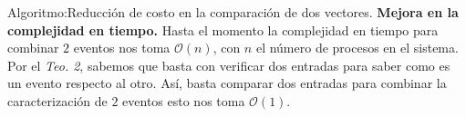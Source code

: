 \begin{frame}{Algoritmo:}{Reducción de costo en la comparación de dos vectores.}
  \justifying
  \textbf{Mejora en la complejidad en tiempo.} Hasta el momento la complejidad
  en tiempo para combinar $2$ eventos nos toma $\mathcal{O}(n)$, con $n$ el
  número de procesos en el sistema.\\[0.3cm]

  Por el \textit{Teo. 2}, sabemos que basta con verificar dos entradas para
  saber como es un evento respecto al otro. Así, basta comparar dos entradas
  para combinar la caracterización de $2$ eventos esto nos toma $\mathcal{O}(1)$.
\end{frame}
